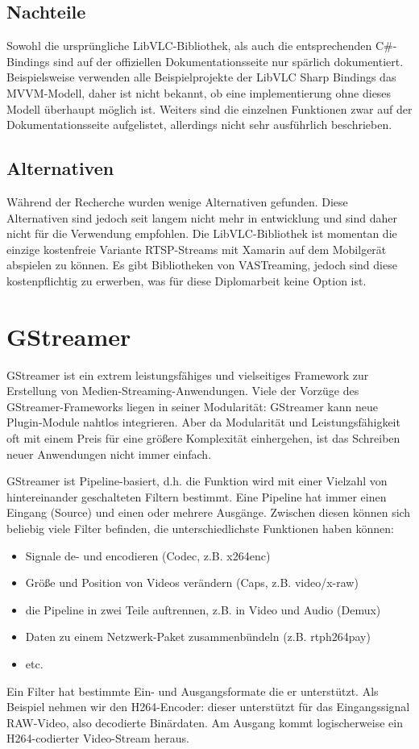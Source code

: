 \subsection{Nachteile}
Sowohl die ursprüngliche LibVLC-Bibliothek, als auch die entsprechenden C\#-Bindings sind auf der offiziellen Dokumentationsseite nur spärlich dokumentiert.\cite[vgl.][]{libvlc-sharp-doc}
Beispielsweise verwenden alle Beispielprojekte der LibVLC Sharp Bindings das MVVM-Modell, daher ist nicht bekannt, ob eine implementierung ohne dieses Modell überhaupt möglich ist.
Weiters sind die einzelnen Funktionen zwar auf der Dokumentationsseite aufgelistet, allerdings nicht sehr ausführlich beschrieben.

\subsection{Alternativen}
Während der Recherche wurden wenige Alternativen gefunden. Diese Alternativen sind jedoch seit langem nicht mehr in entwicklung und sind daher nicht für die Verwendung empfohlen. Die LibVLC-Bibliothek ist momentan die einzige kostenfreie Variante RTSP-Streams mit Xamarin auf dem Mobilgerät abspielen zu können. Es gibt Bibliotheken von VASTreaming, jedoch sind diese kostenpflichtig zu erwerben, was für diese Diplomarbeit keine Option ist.

\section{GStreamer}
GStreamer ist ein extrem leistungsfähiges und vielseitiges Framework zur Erstellung von Medien-Streaming-Anwendungen.
Viele der Vorzüge des GStreamer-Frameworks liegen in seiner Modularität:
GStreamer kann neue Plugin-Module nahtlos integrieren.
Aber da Modularität und Leistungsfähigkeit oft mit einem Preis für eine größere Komplexität einhergehen, ist das Schreiben neuer Anwendungen nicht immer einfach.
\cite[aus dem Englischen übersetzt]{gstreamer}\par

GStreamer ist Pipeline-basiert, d.h. die Funktion wird mit einer Vielzahl von hintereinander geschalteten Filtern bestimmt.
Eine Pipeline hat immer einen Eingang (Source) und einen oder mehrere Ausgänge.
Zwischen diesen können sich beliebig viele Filter befinden, die unterschiedlichste Funktionen haben können:
\begin{itemize}
    \item Signale de- und encodieren (Codec, z.B. x264enc)
    \item Größe und Position von Videos verändern (Caps, z.B. video/x-raw)
    \item die Pipeline in zwei Teile auftrennen, z.B. in Video und Audio (Demux)
    \item Daten zu einem Netzwerk-Paket zusammenbündeln (z.B. rtph264pay)
    \item etc.
\end{itemize}
Ein Filter hat bestimmte Ein- und Ausgangsformate die er unterstützt.
Als Beispiel nehmen wir den H264-Encoder:
dieser unterstützt für das Eingangssignal RAW-Video, also decodierte Binärdaten. Am Ausgang kommt logischerweise ein H264-codierter Video-Stream heraus.\par

